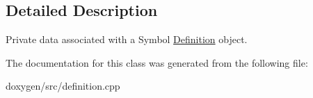 \subsection{Detailed Description}
Private data associated with a Symbol \mbox{\hyperlink{class_definition}{Definition}} object. 

The documentation for this class was generated from the following file\+:\begin{DoxyCompactItemize}
\item 
doxygen/src/definition.\+cpp\end{DoxyCompactItemize}
